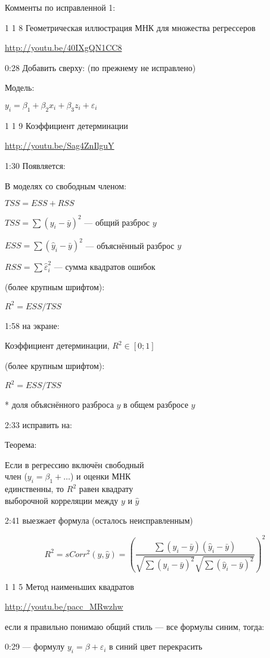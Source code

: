 \documentclass[12pt,a4paper]{article}
\begin{document}
Комменты по исправленной 1:

1 1 8 Геометрическая иллюстрация МНК для множества регрессеров 

\url{http://youtu.be/40IXgQN1CC8}

0:28 Добавить сверху: (по прежнему не исправлено)

Модель:

$y_i=\beta_1+\beta_2 x_i+\beta_3 z_i + \varepsilon_i$


1 1 9 Коэффициент детерминации

\url{http://youtu.be/Sag4ZnIlguY}

1:30 Появляется:

В моделях со свободным членом:

$TSS=ESS+RSS$

$TSS=\sum (y_i-\bar{y})^2$ --- общий разброс $y$

$ESS=\sum (\hat{y}_i-\bar{y})^2$ --- объяснённый разброс $y$

$RSS=\sum \hat{\varepsilon}_i^2$ --- сумма квадратов ошибок

(более крупным шрифтом):

$R^2=ESS/TSS$

1:58 на экране:

Коэффициент детерминации, $R^2 \in [0;1]$

(более крупным шрифтом):

$R^2=ESS/TSS$

* доля объяснённого разброса $y$ в общем разбросе $y$


2:33 исправить на:

Теорема:

Если в регрессию включён свободный \\
член ($y_i=\beta_1 + \ldots$) и оценки МНК \\
единственны, то $R^2$ равен квадрату \\
выборочной корреляции между $y$ и $\hat{y}$

2:41 выезжает формула (осталось неисправленным)

\[
R^2=sCorr^2(y,\hat{y})
=\left(\frac{\sum (y_i-\bar{y})(\hat{y}_i-\bar{y})}{\sqrt{\sum(y_i-\bar{y})^2}\sqrt{\sum(\hat{y}_i-\bar{y})^2}}\right)^2
\]

1 1 5 Метод наименьших квадратов

\url{http://youtu.be/pacc_MRwzhw}

если я правильно понимаю общий стиль --- все формулы синим, тогда: 

0:29 --- формулу $y_i=\beta + \varepsilon_i$ в синий цвет перекрасить
\end{document}
